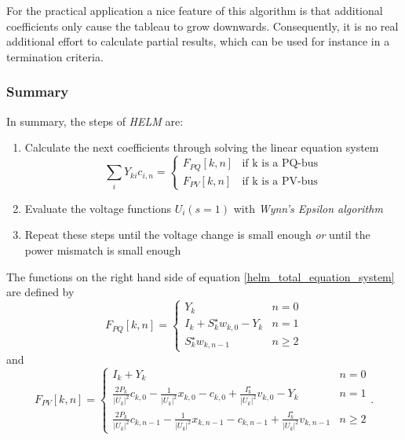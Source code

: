 For the practical application a nice feature of this algorithm is that additional coefficients only cause the tableau to grow downwards. Consequently, it is no real additional effort to calculate partial results, which can be used for instance in a termination criteria.

\subsubsection{Summary}
In summary, the steps of \emph{HELM} are:
\begin{enumerate}
	\item Calculate the next coefficients through solving the linear equation system
	\begin{equation}
		\sum_i Y_{ki} c_{i,n} = 
		\begin{cases}
			F_{PQ}[k,n] & \text{if k is a PQ-bus} \\
			F_{PV}[k,n] & \text{if k is a PV-bus}
		\end{cases}
		\label{eq:helm_total_equation_system}
	\end{equation}
	\item Evaluate the voltage functions $U_i(s = 1)$ with \emph{Wynn's Epsilon algorithm}
	\item Repeat these steps until the voltage change is small enough \emph{or} until the power mismatch is small enough
\end{enumerate}

The functions on the right hand side of equation \eqref{helm_total_equation_system} are defined by
\begin{equation}
	F_{PQ}[k,n] = 
	\begin{cases}
		Y_k & n = 0 \\
		I_k + S_k^\star w_{k,0} - Y_k & n = 1 \\
		S_k^\star w_{k,n - 1} & n \ge 2
	\end{cases}
\end{equation}
and
\begin{equation}
	F_{PV}[k,n] = 
	\begin{cases}
		I_k + Y_k & n = 0 \\
		\frac{2 P_k}{|U_k|^2} c_{k,0} - \frac{1}{|U_k|^2} x_{k,0} - c_{k,0} + \frac{I_k^\star}{|U_k|^2} v_{k,0} - Y_k & n = 1 \\
		\frac{2 P_k}{|U_k|^2} c_{k,n-1} - \frac{1}{|U_k|^2} x_{k,n-1} - c_{k,n-1} + \frac{I_k^\star}{|U_k|^2} v_{k,n-1} & n \ge 2
	\end{cases}.
\end{equation}

